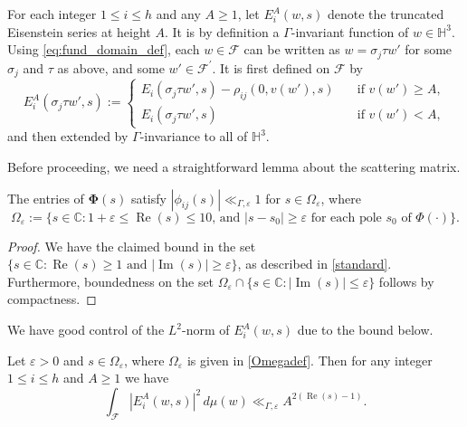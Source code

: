 \documentclass[12pt,reqno]{amsart}
\numberwithin{equation}{section}
\renewcommand{\Im}{\operatorname{Im}}
\renewcommand{\Re}{\operatorname{Re}}
\begin{document}
For each integer $1\leq i\leq h$ and any $A \geq 1$, let $E_i^A(w, s)$ denote the truncated Eisenstein series at height $A$. It is by definition a $\Gamma$-invariant function of $w \in \mathbb{H}^3$. 
Using \eqref{eq:fund_domain_def}, each $w \in \mathcal{F}$ can be written as $w = \sigma_j \tau w'$ for some $\sigma_j$ and $\tau$ as above, and some $w' \in \mathcal{F}^{\prime}$.
It is first defined on $\mathcal{F}$ by
\begin{equation} \label{eq:trunc_eis_series}
    E_i^A(\sigma_j \tau w', s) := 
    \begin{cases}
         E_i(\sigma_j \tau w', s) - \rho_{ij}(0, v(w'), s) & \quad \text{if } v(w') \geq A, \\
         E_i(\sigma_j \tau w', s) & \quad \text{if } v(w') < A,
    \end{cases}
\end{equation}
and then extended by $\Gamma$-invariance to all of $\mathbb{H}^3$.

Before proceeding, we need a straightforward lemma about the scattering matrix.

\begin{lemma} \label{omegalem}
    The entries of $\boldsymbol{\Phi}(s)$ satisfy $|\phi_{ij}(s)| \ll_{\Gamma, \varepsilon} 1$ for $s \in \Omega_{\varepsilon}$, where
    \begin{equation} \label{Omegadef}
        \Omega_{\varepsilon} := \{s \in \mathbb{C}: \text{$1+\varepsilon \leq \Re(s) \leq 10$, and $|s-s_0| \geq \varepsilon$ for each pole $s_0$ of $\Phi(\cdot)$} \}. 
    \end{equation}
\end{lemma}
\begin{proof}
    We have the claimed bound in the set $\{ s \in \mathbb{C} : \Re(s) \geq 1 \text{ and } |{\Im(s)}|  \geq \varepsilon \}$, as described in \cref{standard}. Furthermore, boundedness on the set $\Omega_{\varepsilon} \cap \{s \in \mathbb{C}: |{\Im(s)}| \leq \varepsilon\}$ follows by compactness.
\end{proof}


We have good control of the $L^2$-norm of $E_i^A(w, s)$ due to the bound below.

\begin{lemma}\label{lemma:Maass_Selberg}
    Let $\varepsilon > 0$ and $s \in \Omega_{\varepsilon}$, where $\Omega_{\varepsilon}$ is given in \eqref{Omegadef}. Then for any integer $1\leq i \leq h$ and $A \geq 1$ we have
    \begin{equation*}
        \int_\mathcal{F} |{E_i^A(w, s)}|^2 \, d\mu(w) \ll_{\Gamma, \varepsilon} A^{2(\Re(s)-1)}.
    \end{equation*}
\end{lemma}
\end{document}
